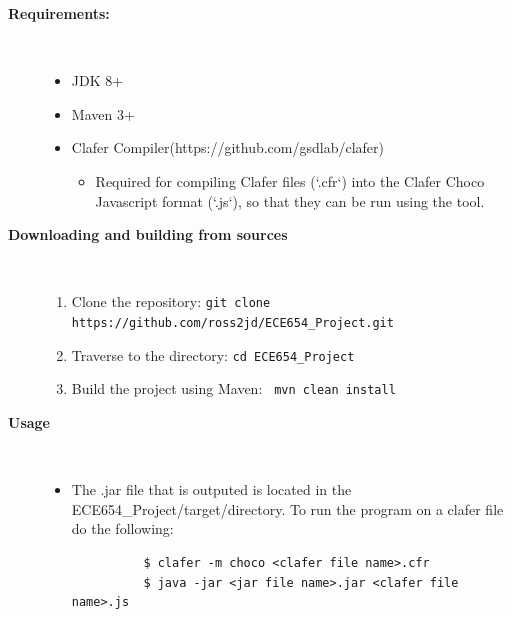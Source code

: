 \documentclass[10pt,oneside]{IEEEtran}
\begin{document}
\begin{description}
  \item[\textbf{Requirements:}] \hfill \\
    \begin{itemize}
      \item JDK 8+
      \item Maven 3+
      \item Clafer Compiler(https://github.com/gsdlab/clafer)
        \begin{itemize}
          \item Required for compiling Clafer files (`.cfr`) into the Clafer Choco Javascript format (`.js`), so that they can be run using the tool.
        \end{itemize}
    \end{itemize}
  \item[\textbf{Downloading and building from sources}] \hfill \\
    \begin{enumerate}
      \item Clone the repository: \lstinline$git clone https://github.com/ross2jd/ECE654_Project.git$
      \item Traverse to the directory: \lstinline$cd ECE654_Project$
      \item Build the project using Maven: \lstinline$ mvn clean install$
    \end{enumerate}
  \item[\textbf{Usage}] \hfill \\
    \begin{itemize}
      \item The .jar file that is outputed is located in the ECE654\_Project/target/directory. To run the program on a clafer file do the following:
        \begin{lstlisting}
          $ clafer -m choco <clafer file name>.cfr
          $ java -jar <jar file name>.jar <clafer file name>.js
        \end{lstlisting}
    \end{itemize}
\end{description}
\end{document}
